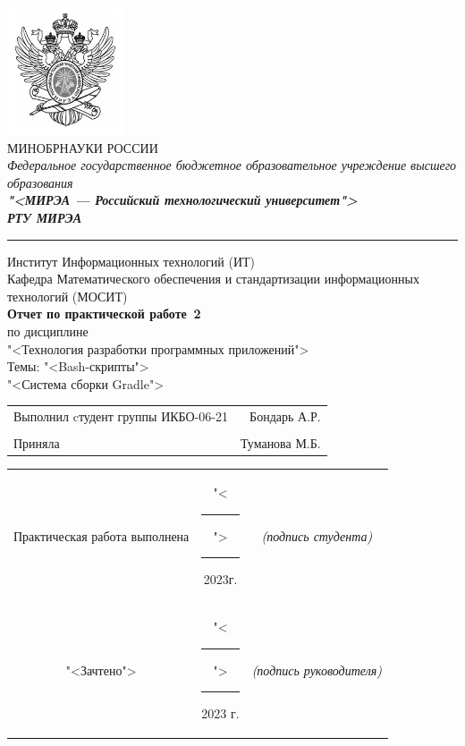 \begin{titlepage}
	
	\thispagestyle{fancy}
	\renewcommand{\headrulewidth}{0pt}

	\begin{center}
		\includegraphics[scale=0.5]{./res/logo.png}\\
		МИНОБРНАУКИ РОССИИ\\
		\textit{Федеральное государственное бюджетное
		образовательное учреждение высшего образования}\\
		\textbf{\textit{"<МИРЭА --- Российский технологический
		университет">}}\\
		{\large\bfseries\itshape РТУ МИРЭА}\\
		\bigskip \hrule \smallskip
		Институт Информационных технологий (ИТ)\\
		\vfill
		Кафедра Математического обеспечения и стандартизации
		информационных технологий (МОСИТ)\\
		\vfill
		\textbf{
			Отчет по практической работе \No\,2\\
		}
		по дисциплине\\
		"<Технология разработки программных приложений">\\
		Темы: "<Bash-скрипты">\\
		"<Система сборки Gradle">
		\vfill
		\vfill
		\begin{small}
			\begin{tabular}{lr}
				Выполнил cтудент группы ИКБО-06-21 & Бондарь А.Р.\\\\
				Приняла & Туманова М.Б.\\
			\end{tabular}
		\end{small}
		\vfill
		\begin{footnotesize}
			\begin{tabular}{ccc}
				Практическая  работа выполнена
				& "<\rule{1ex}{.5pt}">\rule{7ex}{.5pt}2023г.
				& \textit{(подпись студента)}\\
				"<Зачтено"> 
				& "<\rule{1ex}{.5pt}">\rule{7ex}{.5pt}2023 г.
				& \textit{(подпись руководителя)}\\
			\end{tabular}
		\end{footnotesize}
		\vfill
	\end{center}
\end{titlepage}
\setcounter{page}{2}
\clearpage

